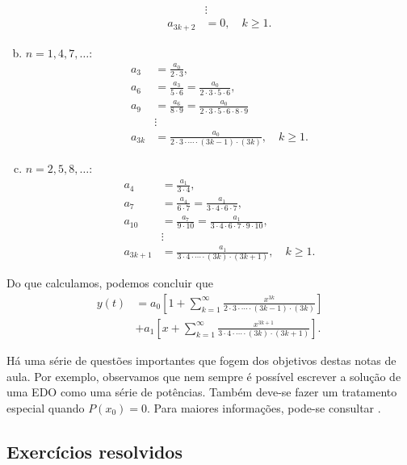 \begin{ex}
\begin{enumerate}[a)]
\begin{align}
      &\vdots \\
      a_{3k+2} &= 0,\quad k\geq 1.
    \end{align}
  \item $n = 1, 4, 7, \ldots$:
    \begin{align}
      a_3 &= \frac{a_0}{2\cdot 3}, \\
      a_6 &= \frac{a_3}{5\cdot 6} = \frac{a_0}{2\cdot 3\cdot 5\cdot 6}, \\
      a_9 &= \frac{a_{6}}{8\cdot 9} = \frac{a_0}{2\cdot 3\cdot 5\cdot 6 \cdot 8 \cdot 9} \\
      &\vdots \\
      a_{3k} &= \frac{a_0}{2\cdot 3 \cdot\cdots\cdot (3k-1)\cdot (3k)},\quad k\geq 1.
    \end{align}
  \item $n = 2, 5, 8, \ldots$:
    \begin{align}
      a_4 &= \frac{a_1}{3\cdot 4}, \\
      a_7 &= \frac{a_4}{6\cdot 7} = \frac{a_1}{3\cdot 4 \cdot 6 \cdot 7},\\
      a_{10} &= \frac{a_{7}}{9\cdot 10} = \frac{a_1}{3\cdot 4 \cdot 6 \cdot 7\cdot 9 \cdot 10},\\
      &\vdots \\
      a_{3k+1} &= \frac{a_1}{3\cdot 4 \cdot\cdots\cdot (3k)\cdot (3k+1)},\quad k\geq 1.
    \end{align}
  \end{enumerate}
  Do que calculamos, podemos concluir que
  \begin{align}
    y(t) &= a_0\left[1 + \sum_{k=1}^\infty \frac{x^{3k}}{2\cdot 3 \cdot\cdots\cdot (3k-1)\cdot (3k)}\right] \\
    &+ a_1\left[x + \sum_{k=1}^\infty \frac{x^{3k+1}}{3\cdot 4 \cdot\cdots\cdot (3k)\cdot (3k+1)}\right].
  \end{align}
\end{ex}

Há uma série de questões importantes que fogem dos objetivos destas notas de aula. Por exemplo, observamos que nem sempre é possível escrever a solução de uma EDO como uma série de potências. Também deve-se fazer um tratamento especial quando $P(x_0)=0$. Para maiores informações, pode-se consultar \cite{Boyce2017}.

\subsection*{Exercícios resolvidos}


